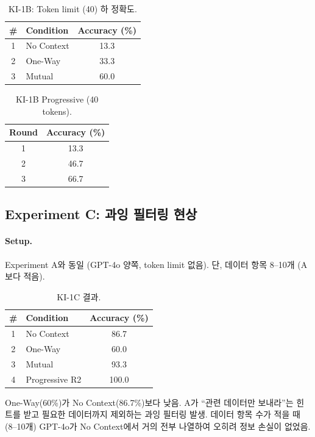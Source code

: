 \documentclass[11pt]{article}
\begin{document}
\begin{table}[h]
\centering
\caption{KI-1B: Token limit (40) 하 정확도.}
\begin{tabular}{clc}
\toprule
\# & Condition & Accuracy (\%) \\
\midrule
1 & No Context  & 13.3 \\
2 & One-Way     & 33.3 \\
3 & Mutual      & 60.0 \\
\bottomrule
\end{tabular}
\end{table}

\begin{table}[h]
\centering
\caption{KI-1B Progressive (40 tokens).}
\begin{tabular}{cc}
\toprule
Round & Accuracy (\%) \\
\midrule
1 & 13.3 \\
2 & 46.7 \\
3 & 66.7 \\
\bottomrule
\end{tabular}
\end{table}


\subsection{Experiment C: 과잉 필터링 현상}

\paragraph{Setup.}
Experiment A와 동일 (GPT-4o 양쪽, token limit 없음). 단, 데이터 항목 8--10개 (A보다 적음).

\begin{table}[h]
\centering
\caption{KI-1C 결과.}
\begin{tabular}{clc}
\toprule
\# & Condition & Accuracy (\%) \\
\midrule
1 & No Context  & 86.7 \\
2 & One-Way     & 60.0 \\
3 & Mutual      & 93.3 \\
4 & Progressive R2 & 100.0 \\
\bottomrule
\end{tabular}
\end{table}

One-Way(60\%)가 No Context(86.7\%)보다 낮음. A가 ``관련 데이터만 보내라''는 힌트를 받고 필요한 데이터까지 제외하는 과잉 필터링 발생. 데이터 항목 수가 적을 때(8--10개) GPT-4o가 No Context에서 거의 전부 나열하여 오히려 정보 손실이 없었음.
\end{document}
